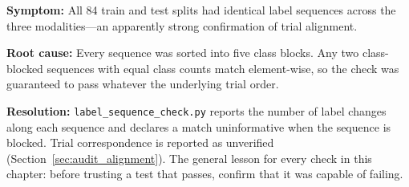 \textbf{Symptom:} All 84 train and test splits had identical label sequences across the
three modalities---an apparently strong confirmation of trial alignment.

\textbf{Root cause:} Every sequence was sorted into five class blocks. Any two
class-blocked sequences with equal class counts match element-wise, so the check was
guaranteed to pass whatever the underlying trial order.

\textbf{Resolution:} \texttt{label\_sequence\_check.py} reports the number of label
changes along each sequence and declares a match uninformative when the sequence is
blocked. Trial correspondence is reported as unverified
(Section~\ref{sec:audit_alignment}). The general lesson for every check in this
chapter: before trusting a test that passes, confirm that it was capable of failing.

